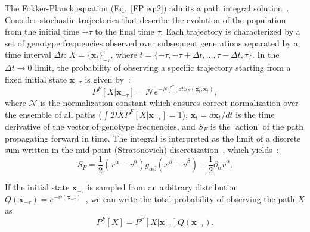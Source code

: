 \documentclass[9pt,twocolumn,twoside]{gsajnl}
\begin{document}
The Fokker-Planck equation (Eq.~\eqref{FP:eq:2}) admits a path integral solution~\citep{Chernyak2006,Mustonen2010}. Consider
stochastic trajectories that describe the evolution of the population from the initial time $-\tau$ to the final time $\tau$. Each trajectory is characterized by a set of genotype frequencies
observed over subsequent generations separated by a time interval $\Delta t$: $X = \{ \mathbf{x}_t \}_{-\tau}^{\tau}$, where $t = \{ -\tau, -\tau+\Delta t, \dots , \tau-\Delta t, \tau \}$. In the $\Delta t \to 0$ limit,
the probability of observing a specific trajectory starting from a fixed initial state $\mathbf{x}_{-\tau}$ is given by~\citep{Chernyak2006}:
\begin{equation} \label{Path:eq:1}
P^F [X | \mathbf{x}_{-\tau}] = \mathcal{N} e^{-N \int_{-\tau}^{\tau} dt S_F (\mathbf{x}_t, \dot{\mathbf{x}}_t)},
\end{equation}
where $\mathcal{N}$ is the normalization constant which ensures correct normalization over the ensemble of all paths
($\int \mathcal{D} X P^F [X | \mathbf{x}_{-\tau}] = 1$), $\dot{\mathbf{x}}_t = {d \mathbf{x}_t}/{dt}$ is the time derivative of the vector of genotype frequencies,
and $S_F$ is the `action' of the path propagating forward in time. The integral is interpreted as the limit of a discrete sum written in the mid-point (Stratonovich) discretization~\citep{Gardiner2009},
which yields~\citep{Chernyak2006}:
\begin{equation} \label{SF:eq:1}
S_F = \frac{1}{2} (\dot{x}^\alpha - \widetilde{v}^\alpha) g_{\alpha \beta} (\dot{x}^\beta - \widetilde{v}^\beta) +  \frac{1}{2} \partial_\alpha \widetilde{v}^\alpha.
\end{equation}

If the initial state $\mathbf{x}_{-\tau}$ is sampled from an arbitrary distribution $Q (\mathbf{x}_{-\tau}) = e^{-\psi (\mathbf{x}_{-\tau})}$~\citep{Seifert2005,Seifert2012}, we can write the total probability of observing the path $X$ as
\begin{equation} \label{Ptot:eq}
P^F [X] = P^F [X | \mathbf{x}_{-\tau}] Q (\mathbf{x}_{-\tau}).
\end{equation}
\end{document}
